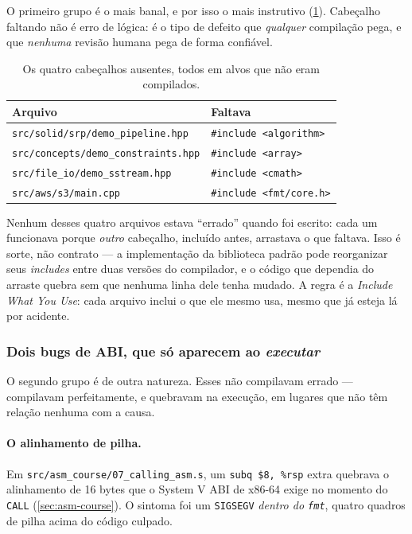O primeiro grupo é o mais banal, e por isso o mais instrutivo
(\cref{tab:includes-faltando}). Cabeçalho faltando não é erro de lógica: é o
tipo de defeito que \emph{qualquer} compilação pega, e que \emph{nenhuma}
revisão humana pega de forma confiável.

\begin{table}[htbp]
\centering
\caption{Os quatro cabeçalhos ausentes, todos em alvos que não eram compilados.}
\label{tab:includes-faltando}
\footnotesize
\begin{tabular}{@{}ll@{}}
\toprule
\textbf{Arquivo} & \textbf{Faltava} \\
\midrule
\texttt{src/solid/srp/demo\_pipeline.hpp}   & \texttt{\#include <algorithm>} \\
\texttt{src/concepts/demo\_constraints.hpp} & \texttt{\#include <array>} \\
\texttt{src/file\_io/demo\_sstream.hpp}     & \texttt{\#include <cmath>} \\
\texttt{src/aws/s3/main.cpp}                & \texttt{\#include <fmt/core.h>} \\
\bottomrule
\end{tabular}
\end{table}

\begin{armadilha}
Nenhum desses quatro arquivos estava ``errado'' quando foi escrito: cada um
funcionava porque \emph{outro} cabeçalho, incluído antes, arrastava o que
faltava. Isso é sorte, não contrato --- a implementação da biblioteca padrão
pode reorganizar seus \emph{includes} entre duas versões do compilador, e o
código que dependia do arraste quebra sem que nenhuma linha dele tenha mudado.
A regra é a \emph{Include What You Use}: cada arquivo inclui o que ele mesmo
usa, mesmo que já esteja lá por acidente.
\end{armadilha}

\subsubsection{Dois bugs de ABI, que só aparecem ao \emph{executar}}

O segundo grupo é de outra natureza. Esses não compilavam errado --- compilavam
perfeitamente, e quebravam na execução, em lugares que não têm relação nenhuma
com a causa.

\paragraph{O alinhamento de pilha.} Em \texttt{src/asm\_course/07\_calling\_asm.s},
um \texttt{subq \$8, \%rsp} extra quebrava o alinhamento de 16 bytes que o
System V ABI de x86-64 exige no momento do \texttt{CALL}
(\cref{sec:asm-course}). O sintoma foi um \texttt{SIGSEGV}
\emph{dentro do \texttt{fmt}}, quatro quadros de pilha acima do código
culpado.

